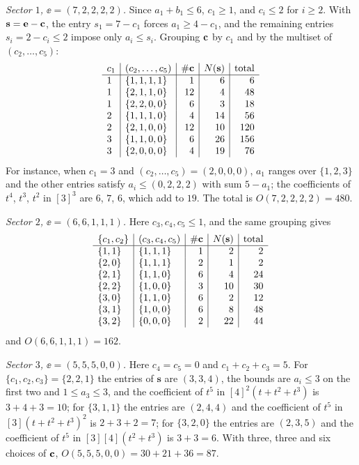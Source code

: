\emph{Sector $1$, $\ee=(7,2,2,2,2)$.} Since $a_1+b_1\le6$, $c_1\ge1$, and
$c_i\le2$ for $i\ge2$. With $\mathbf s=\mathbf{e}-\mathbf{c}$, the entry $s_1=7-c_1$
forces $a_1\ge4-c_1$, and the remaining entries $s_i=2-c_i\le2$ impose only
$a_i\le s_i$. Grouping $\mathbf{c}$ by $c_1$ and by the multiset of
$(c_2,\dots,c_5)$:
\[
\begin{array}{l|l|r|r|r}
c_1&(c_2,\dots,c_5)&\#\mathbf{c}&N(\mathbf s)&\text{total}\\\hline
1&\{1,1,1,1\}&1&6&6\\
1&\{2,1,1,0\}&12&4&48\\
1&\{2,2,0,0\}&6&3&18\\
2&\{1,1,1,0\}&4&14&56\\
2&\{2,1,0,0\}&12&10&120\\
3&\{1,1,0,0\}&6&26&156\\
3&\{2,0,0,0\}&4&19&76
\end{array}
\]
For instance, when $c_1=3$ and $(c_2,\dots,c_5)=(2,0,0,0)$, $a_1$ ranges
over $\{1,2,3\}$ and the other entries satisfy $a_i\le(0,2,2,2)$ with sum
$5-a_1$; the coefficients of $t^4$, $t^3$, $t^2$ in $[3]^3$ are $6$, $7$,
$6$, which add to $19$. The total is $O(7,2,2,2,2)=480$.

\emph{Sector $2$, $\ee=(6,6,1,1,1)$.} Here $c_3,c_4,c_5\le1$, and the same
grouping gives
\[
\begin{array}{l|l|r|r|r}
\{c_1,c_2\}&(c_3,c_4,c_5)&\#\mathbf{c}&N(\mathbf s)&\text{total}\\\hline
\{1,1\}&\{1,1,1\}&1&2&2\\
\{2,0\}&\{1,1,1\}&2&1&2\\
\{2,1\}&\{1,1,0\}&6&4&24\\
\{2,2\}&\{1,0,0\}&3&10&30\\
\{3,0\}&\{1,1,0\}&6&2&12\\
\{3,1\}&\{1,0,0\}&6&8&48\\
\{3,2\}&\{0,0,0\}&2&22&44
\end{array}
\]
and $O(6,6,1,1,1)=162$.

\emph{Sector $3$, $\ee=(5,5,5,0,0)$.} Here $c_4=c_5=0$ and
$c_1+c_2+c_3=5$. For $\{c_1,c_2,c_3\}=\{2,2,1\}$ the entries of
$\mathbf s$ are $(3,3,4)$, the bounds are $a_i\le3$ on the first two and
$1\le a_3\le3$, and the coefficient of $t^5$ in $[4]^2(t+t^2+t^3)$ is
$3+4+3=10$; for $\{3,1,1\}$ the entries are $(2,4,4)$ and the coefficient of
$t^5$ in $[3](t+t^2+t^3)^2$ is $2+3+2=7$; for $\{3,2,0\}$ the entries are
$(2,3,5)$ and the coefficient of $t^5$ in $[3][4](t^2+t^3)$ is $3+3=6$. With
three, three and six choices of $\mathbf{c}$, $O(5,5,5,0,0)=30+21+36=87$.

